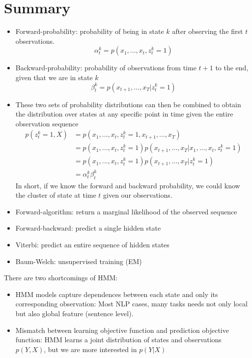 \section{Summary}

\begin{itemize}
	\item Forward-probability: probability of being in state $k$ after observing the first $t$ observations. 
	$$\alpha_t^k = p(x_1,...,x_t,z_t^k=1)$$
	\item Backward-probability: probability of observations from time $t+1$ to the end, given that we are in state $k$ 
	$$\beta_t^k = p(x_{t+1},...,x_T|z_t^k=1)$$
	\item These two sets of probability distributions can then be combined to obtain the distribution over states at any specific point in time given the entire observation sequence
	\begin{align*}
	p(z_t^k=1,X) &= p(x_1,...,x_t, z_t^k=1, x_{t+1},...,x_T)\\
	& = p(x_1,...,x_t, z_t^k=1)p(x_{t+1},...,x_T|x_1,...,x_t, z_t^k=1)\\
	& = p(x_1,...,x_t, z_t^k=1)p(x_{t+1},...,x_T|z_t^k=1)\\
	& = \alpha_{t}^k\beta_{t}^k
	\end{align*}
	In short, if we know the forward and backward probability, we could know the cluster of state at time $t$ given our observations. 
	\item Forward-algorithm: return a marginal likelihood of the observed sequence
	\item Forward-backward: predict a single hidden state
	\item Viterbi: predict an entire sequence of hidden states
	\item Baum-Welch: unsupervised training (EM)
\end{itemize}

There are two shortcomings of HMM:
\begin{itemize}
	\item HMM models capture dependences between each state and only its
	corresponding observation: Most NLP cases, many tasks needs not only local but also global feature (sentence level).
	\item Mismatch between learning objective function and prediction
	objective function: HMM learns a joint distribution of states and observations $p(Y,X)$, but we are more interested in $p(Y|X)$
\end{itemize}